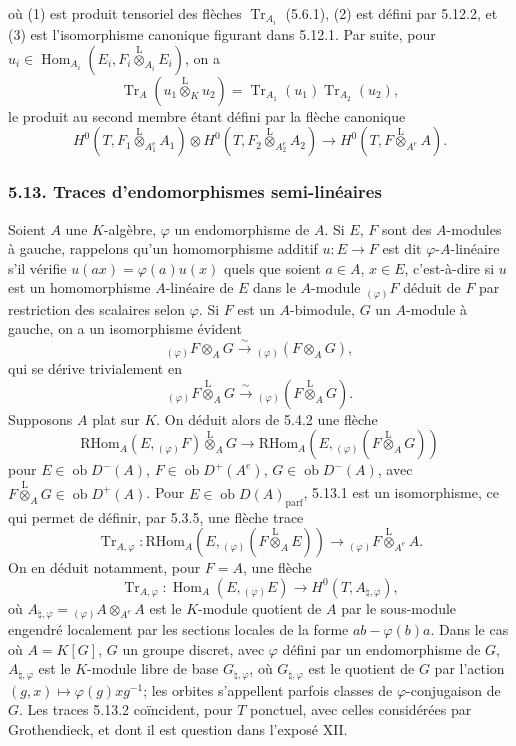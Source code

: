 \documentclass[11pt]{article}
\DeclareMathOperator{\Hom}{Hom}
\newcommand{\ob}{\operatorname{ob}}
\providecommand{\RHom}{\mathrm{RHom}}
\providecommand{\Tr}{\operatorname{Tr}}
\providecommand{\Tr}{\operatorname{Tr}}
\providecommand{\lten}{\overset{\mathrm L}{\otimes}}
\providecommand{\Tr}{\operatorname{Tr}}
\providecommand{\RHom}{\mathrm{RHom}}
\providecommand{\Hom}{\operatorname{Hom}}
\providecommand{\ob}{\operatorname{ob}}
\providecommand{\lten}{\overset{\mathrm L}{\otimes}}
\providecommand{\RHom}{\mathrm R\mathcal{H}om}
\providecommand{\lten}{\overset{\mathrm L}{\otimes}}
\providecommand{\Tr}{\operatorname{Tr}}
\providecommand{\lten}{\overset{\mathrm L}{\otimes}}
\providecommand{\lten}{\overset{\mathrm L}{\otimes}}
\providecommand{\lten}{\overset{\mathrm L}{\otimes}}
\begin{document}
où (1) est produit tensoriel des flèches $\Tr_{A_i}$ (5.6.1), (2) est défini par 5.12.2, et (3) est l'isomorphisme canonique figurant dans 5.12.1. Par suite, pour $u_i\in\Hom_{A_i}(E_i,F_i\lten_{A_i}E_i)$, on a
\begin{equation}\tag{5.12.5}
\Tr_A(u_1\lten_Ku_2)=\Tr_{A_1}(u_1)\Tr_{A_2}(u_2),
\end{equation}
le produit au second membre étant défini par la flèche canonique
\[
H^0(T,F_1\lten_{A_1^e}A_1)\otimes H^0(T,F_2\lten_{A_2^e}A_2)
\longrightarrow H^0(T,F\lten_{A^e}A).
\]

\subsubsection*{5.13. Traces d'endomorphismes semi-linéaires}

Soient $A$ une $K$-algèbre, $\varphi$ un endomorphisme de $A$. Si $E$, $F$ sont des $A$-modules à gauche, rappelons qu'un homomorphisme additif $u:E\to F$ est dit $\varphi$-$A$-linéaire s'il vérifie $u(ax)=\varphi(a)u(x)$ quels que soient $a\in A$, $x\in E$, c'est-à-dire si $u$ est un homomorphisme $A$-linéaire de $E$ dans le $A$-module ${}_{(\varphi)}F$ déduit de $F$ par restriction des scalaires selon $\varphi$. Si $F$ est un $A$-bimodule, $G$ un $A$-module à gauche, on a un isomorphisme évident
\[
{}_{(\varphi)}F\otimes_AG\xrightarrow{\sim}{}_{(\varphi)}(F\otimes_AG),
\]
qui se dérive trivialement en
\[
{}_{(\varphi)}F\lten_AG\xrightarrow{\sim}{}_{(\varphi)}(F\lten_AG).
\]
Supposons $A$ plat sur $K$. On déduit alors de 5.4.2 une flèche
\begin{equation}\tag{5.13.1}
\RHom_A(E,{}_{(\varphi)}F)\lten_AG\longrightarrow\RHom_A(E,{}_{(\varphi)}(F\lten_AG))
\end{equation}
pour $E\in\ob D^-(A)$, $F\in\ob D^+(A^e)$, $G\in\ob D^-(A)$, avec $F\lten_AG\in\ob D^+(A)$. Pour $E\in\ob D(A)_{\mathrm{parf}}$, 5.13.1 est un isomorphisme, ce qui permet de définir, par 5.3.5, une flèche trace
\begin{equation}\tag{5.13.2}
\Tr_{A,\varphi}:\RHom_A(E,{}_{(\varphi)}(F\lten_AE))\longrightarrow {}_{(\varphi)}F\lten_{A^e}A.
\end{equation}
On en déduit notamment, pour $F=A$, une flèche
\begin{equation}\tag{5.13.3}
\Tr_{A,\varphi}:\Hom_A(E,{}_{(\varphi)}E)\longrightarrow H^0(T,A_{\natural,\varphi}),
\end{equation}
où $A_{\natural,\varphi}={}_{(\varphi)}A\otimes_{A^e}A$ est le $K$-module quotient de $A$ par le sous-module engendré localement par les sections locales de la forme $ab-\varphi(b)a$. Dans le cas où $A=K[G]$, $G$ un groupe discret, avec $\varphi$ défini par un endomorphisme de $G$, $A_{\natural,\varphi}$ est le $K$-module libre de base $G_{\natural,\varphi}$, où $G_{\natural,\varphi}$ est le quotient de $G$ par l'action $(g,x)\mapsto\varphi(g)xg^{-1}$; les orbites s'appellent parfois classes de $\varphi$-conjugaison de $G$. Les traces 5.13.2 coïncident, pour $T$ ponctuel, avec celles considérées par Grothendieck, et dont il est question dans l'exposé XII.
\end{document}
